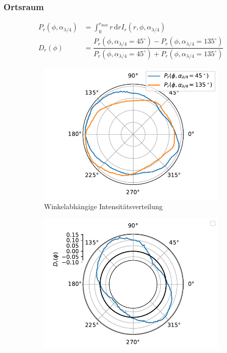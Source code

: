\documentclass[a4paper, titlepage,  ngerman, fullpage]{book}
\begin{document}
		\subsubsection{Ortsraum}
		\begin{align}
			\label{eq:integration_angular_int}
			P_r(\phi, \alpha_{\lambda/4}) &= \int_{0}^{r_\mathrm{max}}r\,\mathrm{d}r I_r(r, \phi, \alpha_{\lambda /4}) \\
			D_r(\phi) &= \dfrac{P_r(\phi, \alpha_{\lambda/4} = 45^\circ) - P_r(\phi, \alpha_{\lambda/4} = 135^\circ)}{P_r(\phi, \alpha_{\lambda/4} = 45^\circ) + P_r(\phi, \alpha_{\lambda/4} = 135^\circ)}
		\end{align}
		\begin{figure}		
			\begin{subfigure}{0.5\textwidth}
				\centering
				\includegraphics[width=\textwidth]{figures/new/4_7_fp_angular_distribution_45_135.pdf}
				\caption{Winkelabhängige Intensitätsverteilung}
				\label{fig:angular_int_fp}
			\end{subfigure}
			\hfill
			\begin{subfigure}{0.49\textwidth}
				\centering
				\includegraphics[width=\textwidth]{figures/new/4_7_fp_angular_distribution_diff_45_135.pdf}

\end{subfigure}
\end{figure}
\end{document}

